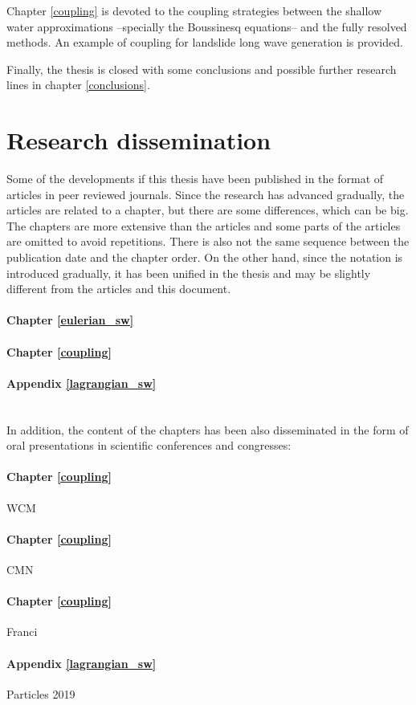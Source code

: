 Chapter \ref{coupling} is devoted to the coupling strategies between the shallow water approximations --specially the Boussinesq equations-- and the fully resolved methods. An example of coupling for landslide long wave generation is provided.

Finally, the thesis is closed with some conclusions and possible further research lines in chapter \ref{conclusions}.



\section{Research dissemination}


Some of the developments if this thesis have been published in the format of articles in peer reviewed journals. Since the research has advanced gradually, the articles are related to a chapter, but there are some differences, which can be big.
The chapters are more extensive than the articles and some parts of the articles are omitted to avoid repetitions.
There is also not the same sequence between the publication date and the chapter order.
On the other hand, since the notation is introduced gradually, it has been unified in the thesis and may be slightly different from the articles and this document.

\paragraph{Chapter \ref{eulerian_sw}} 
\paragraph{Chapter \ref{coupling}} 
\paragraph{Appendix \ref{lagrangian_sw}} 
\\

In addition, the content of the chapters has been also disseminated in the form of oral presentations in scientific conferences and congresses:

\paragraph{Chapter \ref{coupling}} WCM
\paragraph{Chapter \ref{coupling}} CMN
\paragraph{Chapter \ref{coupling}} Franci
\paragraph{Appendix \ref{lagrangian_sw}} Particles 2019




